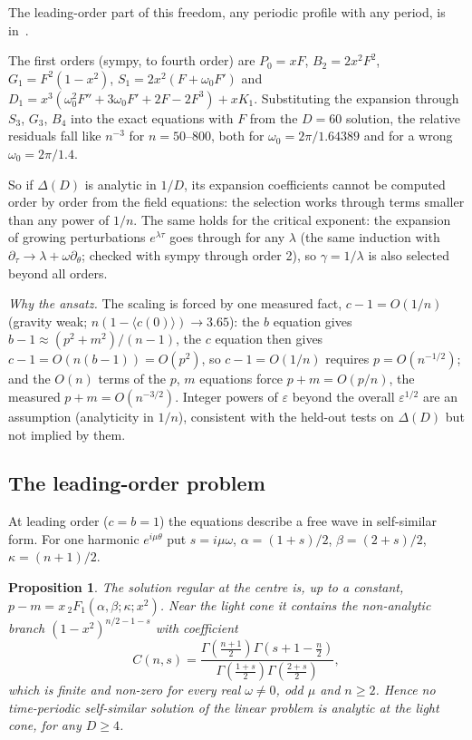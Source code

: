 \documentclass[aps,prd,onecolumn,superscriptaddress,nofootinbib,10pt]{revtex4-2}
\newcommand{\eps}{\varepsilon}
\newtheorem{proposition}{Proposition}
\begin{document}
The leading-order part of this freedom, any periodic profile with any period, is in~\cite{EckerEckerGrumiller2026}.

The first orders (sympy, to fourth order) are $P_0 = xF$, $B_2 = 2x^2F^2$, $G_1 = F^2(1-x^2)$,
$S_1 = 2x^2(F + \omega_0F')$ and $D_1 = x^3(\omega_0^2F'' + 3\omega_0F' + 2F - 2F^3) + xK_1$. Substituting the expansion
through $S_3$, $G_3$, $B_4$ into the exact equations with $F$ from the $D = 60$ solution, the relative residuals fall
like $n^{-3}$ for $n = 50$--$800$, both for $\omega_0 = 2\pi/1.64389$ and for a wrong $\omega_0 = 2\pi/1.4$.

So if $\Delta(D)$ is analytic in $1/D$, its expansion coefficients cannot be computed order by order from the field
equations: the selection works through terms smaller than any power of $1/n$. The same holds for the critical
exponent: the expansion of growing perturbations $e^{\lambda\tau}$ goes through for any $\lambda$ (the same induction
with $\partial_\tau \to \lambda + \omega\partial_\theta$; checked with sympy through order 2), so $\gamma = 1/\lambda$ is also
selected beyond all orders.

\emph{Why the ansatz.} The scaling is forced by one measured fact, $c - 1 = O(1/n)$ (gravity weak;
$n(1 - \langle c(0)\rangle) \to 3.65$): the $b$ equation gives $b - 1 \approx (p^2+m^2)/(n-1)$, the $c$ equation then gives
$c - 1 = O(n(b-1)) = O(p^2)$, so $c - 1 = O(1/n)$ requires $p = O(n^{-1/2})$; and the $O(n)$ terms of the $p$, $m$ equations
force $p + m = O(p/n)$, the measured $p + m = O(n^{-3/2})$. Integer powers of $\eps$ beyond the overall $\eps^{1/2}$ are an
assumption (analyticity in $1/n$), consistent with the held-out tests on $\Delta(D)$ but not implied by them.

\subsection{The leading-order problem}

At leading order ($c = b = 1$) the equations describe a free wave in self-similar form. For one harmonic
$e^{i\mu\theta}$ put $s = i\mu\omega$, $\alpha = (1+s)/2$, $\beta = (2+s)/2$, $\kappa = (n+1)/2$.

\begin{proposition}\label{prop:2}
The solution regular at the centre is, up to a constant, $p - m = x\,{}_2F_1(\alpha,\beta;\kappa;x^2)$. Near the light
cone it contains the non-analytic branch $(1-x^2)^{n/2-1-s}$ with coefficient
\begin{equation}
C(n,s) = \frac{\Gamma\!\left(\frac{n+1}{2}\right)\Gamma\!\left(s+1-\frac n2\right)}{\Gamma\!\left(\frac{1+s}{2}\right)\Gamma\!\left(\frac{2+s}{2}\right)},
\label{eq:C}
\end{equation}
which is finite and non-zero for every real $\omega \ne 0$, odd $\mu$ and $n \ge 2$. Hence no time-periodic
self-similar solution of the linear problem is analytic at the light cone, for any $D \ge 4$.
\end{proposition}
\end{document}
